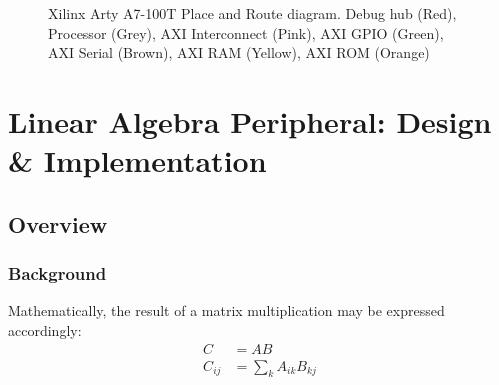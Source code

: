 \documentclass[a4paper,8pt]{report}
\begin{document}
\begin{figure}[h]
  \centering
  \caption{Xilinx Arty A7-100T Place and Route diagram. Debug hub (Red), Processor (Grey), AXI Interconnect (Pink), AXI GPIO (Green), AXI Serial
    (Brown), AXI RAM (Yellow), AXI ROM (Orange)}
  \label{fig:soc_pr}
\end{figure}

\chapter{Linear Algebra Peripheral: Design \& Implementation}
\section{Overview}
\subsection{Background}
Mathematically, the result of a matrix multiplication may be expressed
accordingly:
\begin{align*}
  C &= AB \\
  C_{ij} &= \sum_k A_{ik}B_{kj}
\end{align*}
\end{document}
